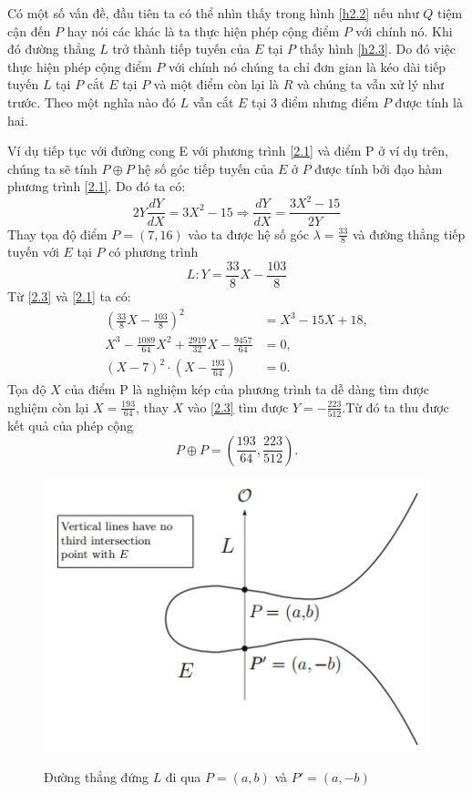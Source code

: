 \documentclass[a4paper,12pt]{report}
\begin{document}
Có một số vấn đề, đầu tiên ta có thể nhìn thấy trong hình \ref{h2.2} nếu như $Q$ tiệm cận đến $P$ hay nói các khác là ta thực hiện phép cộng điểm $P$ với chính nó. Khi đó đường thẳng $L$ trở thành tiếp tuyến của $E$ tại $P$ thấy hình \ref{h2.3}. Do đó việc thực hiện phép cộng điểm $P$ với chính nó chúng ta chỉ đơn gian là kéo dài tiếp tuyến $L$ tại $P$ cắt $E$ tại $P$ và một điểm còn lại là $R$ và chúng ta vẫn xử lý như trước. Theo một nghĩa nào đó $L$ vẫn cắt $E$ tại 3 điểm nhưng điểm $P$ được tính là hai.

Ví dụ tiếp tục với đường cong E với phương trình \ref{2.1} và điểm P ở ví dụ trên, chúng ta sẽ tính $P \oplus P$ hệ số góc tiếp tuyến của $E$ ở $P$ được tính bởi đạo hàm phương trình \ref{2.1}. Do đó ta có:
\begin{displaymath}
2Y\frac{dY}{dX} = 3X^2 - 15 \Rightarrow \frac{dY}{dX} = \frac{3X^2 - 15}{2Y}
\end{displaymath}
Thay tọa độ điểm $P = (7,16)$ vào ta được hệ số góc $\lambda = \frac{33}{8}$ và đường thẳng tiếp tuyến với $E$ tại $P$ có phương trình
\begin{equation}
L: Y = \frac{33}{8}X - \frac{103}{8} \label{2.3}
\end{equation}
Từ \ref{2.3} và \ref{2.1} ta có:
\begin{displaymath}
\begin{aligned}
(\frac{33}{8}X - \frac{103}{8})^2 & = X^3 - 15X + 18, \\
X^3 - \frac{1089}{64}X^2 + \frac{2919}{32}X - \frac{9457}{64} & = 0, \\
(X - 7)^2\cdot(X - \frac{193}{64}) & = 0.
\end{aligned}
\end{displaymath}
Tọa độ $X$ của điểm P là nghiệm kép của phương trình ta dễ dàng tìm được nghiệm còn lại $\displaystyle X = \frac{193}{64}$, thay $X$ vào \ref{2.3} tìm được $\displaystyle Y = -\frac{223}{512}$.Từ đó ta thu được kết quả của phép cộng
\begin{displaymath}
P \oplus P = (\frac{193}{64}, \frac{223}{512}).
\end{displaymath}

\begin{figure}[h]
\begin{center}
\includegraphics[scale=1]{../im4.png} \label{h2.4}
\caption{Đường thẳng đứng $L$ đi qua $P = (a, b)$ và $P' = (a, -b)$}
\end{center}
\end{figure}
\end{document}
